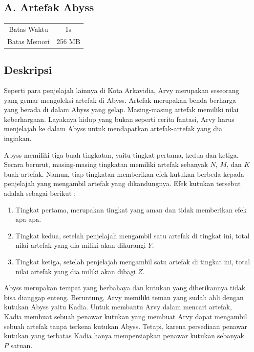 \documentclass{article}
\begin{document}
\begin{center}
    \section*{A. Artefak Abyss} %

    \begin{tabular}{ | c c | }
        \hline
        Batas Waktu  & 1s \\    %
        Batas Memori & 256 MB \\  %
        \hline
    \end{tabular}
\end{center}

\subsection*{Deskripsi}
Seperti para penjelajah lainnya di Kota Arkavidia, Arvy merupakan seseorang yang gemar mengoleksi artefak di Abyss. Artefak merupakan benda berharga yang berada di dalam Abyss yang gelap. Masing-masing artefak memiliki nilai keberhargaan. Layaknya hidup yang bukan seperti cerita fantasi, Arvy harus menjelajah ke dalam Abyss untuk mendapatkan artefak-artefak yang dia inginkan.

Abyss memiliki tiga buah tingkatan, yaitu tingkat pertama, kedua dan ketiga. Secara berurut, masing-masing tingkatan memiliki artefak sebanyak $N$, $M$, dan $K$ buah artefak. Namun, tiap tingkatan memberikan efek kutukan berbeda kepada penjelajah yang mengambil artefak yang dikandungnya. Efek kutukan tersebut adalah sebagai berikut :

\begin{enumerate}
    \setlength\itemsep{0pt}
    \item Tingkat pertama, merupakan tingkat yang aman dan tidak memberikan efek apa-apa.
    \item Tingkat kedua, setelah penjelajah mengambil satu artefak di tingkat ini, total nilai artefak yang dia miliki akan dikurangi $Y$.
    \item Tingkat ketiga, setelah penjelajah mengambil satu artefak di tingkat ini, total nilai artefak yang dia miliki akan dibagi $Z$.
\end{enumerate}

Abyss merupakan tempat yang berbahaya dan kutukan yang diberikannya tidak bisa dianggap enteng. Beruntung, Arvy memiliki teman yang sudah ahli dengan kutukan Abyss yaitu Kadia. Untuk membantu Arvy dalam mencari artefak, Kadia membuat sebuah penawar kutukan yang membuat Arvy dapat mengambil sebuah artefak tanpa terkena kutukan Abyss. Tetapi, karena persediaan penawar kutukan yang terbatas Kadia hanya mempersiapkan penawar kutukan sebanyak $P$ satuan.
\end{document}
